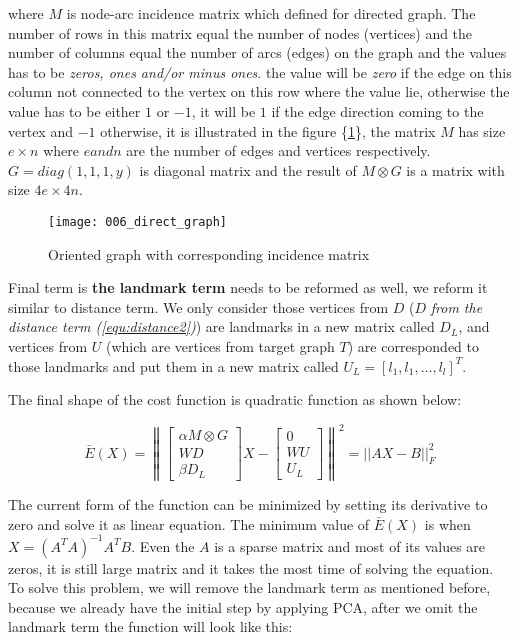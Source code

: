 \documentclass[../structure.tex]{subfiles}
\begin{document}
where $M$ is node-arc incidence matrix which defined for directed graph. The number of rows in this matrix equal the number of nodes (vertices) and the number of columns equal the number of arcs (edges) on the graph and the values has to be \textit{zeros, ones and/or minus ones}. the value will be \textit{zero} if the edge on this column not connected to the vertex on this row where the value lie, otherwise the value has to be either $1$ or $-1$, it will be $1$ if the edge direction coming to the vertex and $-1$ otherwise, it is illustrated in the figure \{\ref{fig:directed_graph}\}, the matrix $M$ has size $e\times n$ where $e and n$ are the number of edges and vertices respectively. $G = diag(1,1,1,y)$ is diagonal matrix  and the result of $M \otimes G$ is a matrix with size $4e \times 4n$.


\begin{figure}[h!]
\centering
\texttt{[image: 006\_direct\_graph]}
\captionsetup{justification=centering}
\caption{Oriented graph with corresponding incidence matrix  \cite{Wikipedia2010}}
\label{fig:directed_graph}
\end{figure}

Final term is \textbf{the landmark term} needs to be reformed as well, we reform it similar to distance term. We only consider those vertices from $D$ ($D$ \textit{from the distance term (\ref{equ:distance2})}) are landmarks in a new matrix called $D_{L}$, and vertices from $U$ (which are vertices from target graph $T$) are corresponded to those landmarks and put them in a new matrix called $U_{L} = [l_{1}, l_{1}, \dots,l_{l}]^T$.

The final shape of the cost function is quadratic function as shown below:

\begin{equation}
\bar{E}(X) = \left\|
\begin{bmatrix}
\alpha M \otimes G \\ WD \\ \beta D_{L}
\end{bmatrix}
X -
\begin{bmatrix}
0 \\ WU \\ U_{L}
\end{bmatrix}
\right\| ^2 = ||AX - B||_{F}^2
\end{equation}

The current form of the function can be minimized by setting its derivative to zero and solve it as linear equation. The minimum value of $\bar{E}(X)$ is when $X = (A^T A)^{-1} A^T B$. Even the $A$ is a sparse matrix and most of its values are zeros, it is still large matrix and it takes the most time of solving the equation. To solve this problem, we will remove the landmark term as mentioned before, because we already have the initial step by applying PCA, after we omit the landmark term the function will look like this:
\end{document}
